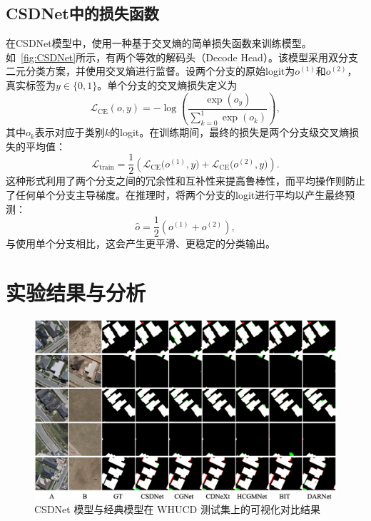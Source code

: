 \subsection{CSDNet中的损失函数}
在CSDNet模型中，使用一种基于交叉熵的简单损失函数来训练模型。如~\ref{fig:CSDNet}所示，有两个等效的解码头（Decode Head）。该模型采用双分支二元分类方案，并使用交叉熵进行监督。设两个分支的原始logit为\(o^{(1)}\)和\(o^{(2)}\)，真实标签为\(y\in\{0,1\}\)。单个分支的交叉熵损失定义为
\begin{equation}
\mathcal{L}_{\mathrm{CE}}(o, y)
= -\log\left(\frac{\exp(o_{y})}{\sum_{k=0}^1 \exp(o_{k})}\right),
\end{equation}
其中\(o_k\)表示对应于类别\(k\)的logit。在训练期间，最终的损失是两个分支级交叉熵损失的平均值：
\begin{equation}
\mathcal{L}_{\text{train}}
= \frac{1}{2}\left(\mathcal{L}_{\mathrm{CE}}\bigl(o^{(1)}, y\bigr)
+ \mathcal{L}_{\mathrm{CE}}\bigl(o^{(2)}, y\bigr)\right).
\end{equation}
这种形式利用了两个分支之间的冗余性和互补性来提高鲁棒性，而平均操作则防止了任何单个分支主导梯度。在推理时，将两个分支的logit进行平均以产生最终预测：
\begin{equation}
\hat{o} = \frac{1}{2}\left(o^{(1)} + o^{(2)}\right),
\end{equation}
与使用单个分支相比，这会产生更平滑、更稳定的分类输出。

\section{实验结果与分析}

\begin{figure}[!htbp]
	\centering
	\includegraphics[width=\linewidth]{paper_figures/基于双时相遥感影像风格解缠和内容细化增强遥感变化检测方法/csdnet_whucd.png}
    \caption{CSDNet 模型与经典模型在 WHUCD 测试集上的可视化对比结果}
	\label{fig:csdnet_whucd}
\end{figure}

